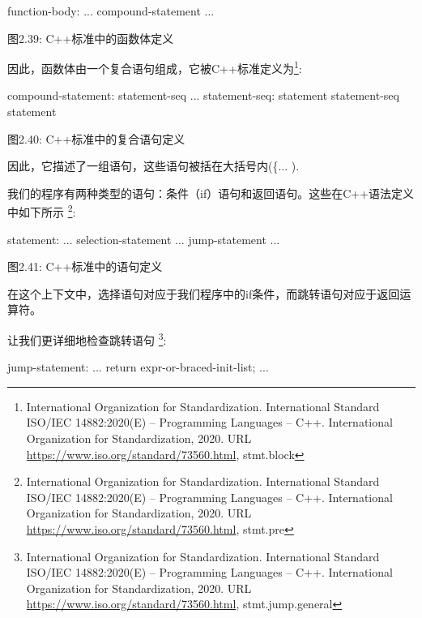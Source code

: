 \begin{shell}
function-body:
    ... compound-statement
    ...
\end{shell}

\begin{center}
图2.39: C++标准中的函数体定义
\end{center}

因此，函数体由一个复合语句组成，它被C++标准定义为\footnote{International Organization for Standardization. International Standard ISO/IEC 14882:2020(E) – Programming Languages – C++. International Organization for Standardization, 2020. URL \url{https://www.iso.org/standard/73560.html}, stmt.block}:

\begin{shell}
compound-statement:
    { statement-seq ... }
statement-seq:
    statement
    statement-seq statement
\end{shell}

\begin{center}
图2.40: C++标准中的复合语句定义
\end{center}

因此，它描述了一组语句，这些语句被括在大括号内(\{... ).

我们的程序有两种类型的语句：条件（if）语句和返回语句。这些在C++语法定义中如下所示 \footnote{International Organization for Standardization. International Standard ISO/IEC 14882:2020(E) – Programming Languages – C++. International Organization for Standardization, 2020. URL \url{https://www.iso.org/standard/73560.html}, stmt.pre}:

\begin{shell}
statement:
    ...
    selection-statement
    ...
    jump-statement
    ...
\end{shell}

\begin{center}
图2.41: C++标准中的语句定义
\end{center}

在这个上下文中，选择语句对应于我们程序中的if条件，而跳转语句对应于返回运算符。

让我们更详细地检查跳转语句 \footnote{International Organization for Standardization. International Standard ISO/IEC 14882:2020(E) – Programming Languages – C++. International Organization for Standardization, 2020. URL \url{https://www.iso.org/standard/73560.html}, stmt.jump.general}:

\begin{shell}
jump-statement:
    ...
    return expr-or-braced-init-list;
    ...
\end{shell}

